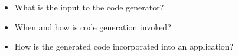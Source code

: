 \vspace{-2ex}
\begin{singlespace}
\begin{itemize}
\item What is the input to the code generator?
\item When and how is code generation invoked?
\item How is the generated code incorporated into an application?
\end{itemize}
\end{singlespace}















